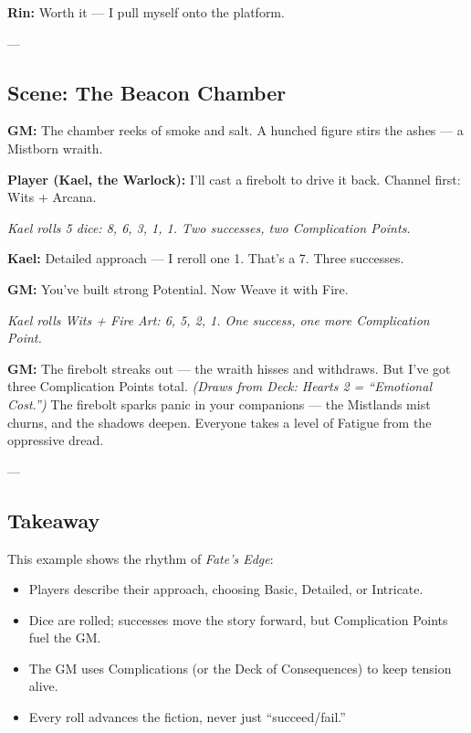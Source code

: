 \documentclass[11pt]{article}
\begin{document}
\textbf{Rin:} Worth it — I pull myself onto the platform.  

---

\subsection*{Scene: The Beacon Chamber}

\textbf{GM:} The chamber reeks of smoke and salt. A hunched figure stirs the ashes — a Mistborn wraith.  

\textbf{Player (Kael, the Warlock):} I’ll cast a firebolt to drive it back. Channel first: Wits + Arcana.  

\textit{Kael rolls 5 dice: 8, 6, 3, 1, 1. Two successes, two Complication Points.}  

\textbf{Kael:} Detailed approach — I reroll one 1. That’s a 7. Three successes.  

\textbf{GM:} You’ve built strong Potential. Now Weave it with Fire.  

\textit{Kael rolls Wits + Fire Art: 6, 5, 2, 1. One success, one more Complication Point.}  

\textbf{GM:} The firebolt streaks out — the wraith hisses and withdraws. But I’ve got three Complication Points total.  
\textit{(Draws from Deck: Hearts 2 = “Emotional Cost.”)}  
The firebolt sparks panic in your companions — the Mistlands mist churns, and the shadows deepen. Everyone takes a level of Fatigue from the oppressive dread.  

---

\subsection*{Takeaway}
This example shows the rhythm of \textit{Fate’s Edge}:
\begin{itemize}
  \item Players describe their approach, choosing Basic, Detailed, or Intricate.  
  \item Dice are rolled; successes move the story forward, but Complication Points fuel the GM.  
  \item The GM uses Complications (or the Deck of Consequences) to keep tension alive.  
  \item Every roll advances the fiction, never just “succeed/fail.”  
\end{itemize}
\end{document}
